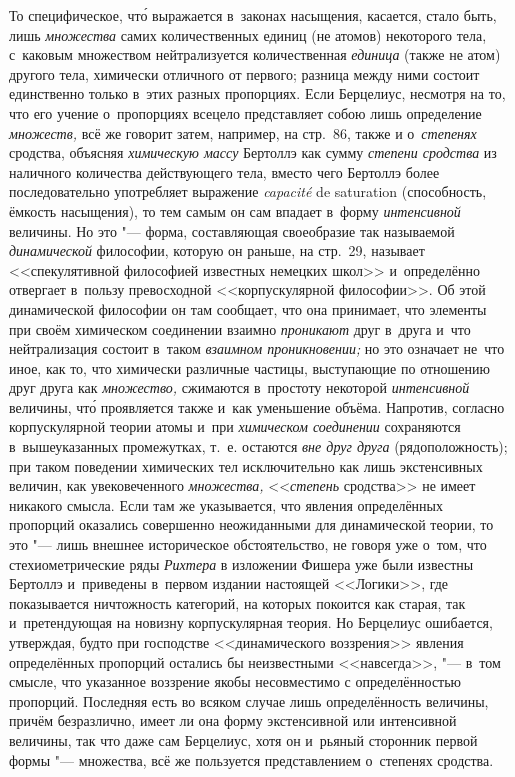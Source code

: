 То специфическое, чт\'{о} выражается в~законах насыщения, касается, стало быть,
лишь {\em множества} самих количественных единиц (не атомов) некоторого тела,
с~каковым множеством нейтрализуется количественная {\em единица} (также не
атом) другого тела, химически отличного от первого; разница между ними состоит
единственно только в~этих разных пропорциях. Если Берцелиус, несмотря на то,
что его учение о~пропорциях всецело представляет собою лишь определение
{\em множеств,} всё же говорит затем, например, на стр.~86, также и
о~{\em степенях} сродства, объясняя {\em химическую массу} Бертоллэ как сумму
{\em степени сродства} из наличного количества действующего тела, вместо чего
Бертоллэ более последовательно употребляет выражение {\em capa\-cité} de
satura\-tion (способность, ёмкость насыщения), то тем самым он сам впадает
в~форму {\em интенсивной} величины. Но это "--- форма, составляющая своеобразие
так называемой {\em динамической} философии, которую он раньше, на стр.~29,
называет <<спекулятивной философией известных немецких школ>> и~определённо
отвергает в~пользу превосходной <<корпускулярной философии>>. Об этой
динамической философии он там сообщает, что она принимает, что элементы при
своём химическом соединении взаимно {\em проникают} друг в~друга и~что
нейтрализация состоит в~таком {\em взаимном проникновении;} но это означает
не~что иное, как то, что химически различные частицы, выступающие по отношению
друг друга как {\em множество,} сжимаются в~простоту некоторой
{\em интенсивной} величины, чт\'{о} проявляется также и~как уменьшение объёма.
Напротив, согласно корпускулярной теории атомы и~при
{\em химическом соединении} сохраняются в~вышеуказанных промежутках, т.~е.
остаются {\em вне друг друга} (рядоположность); при таком поведении химических
тел исключительно как лишь экстенсивных величин, как увековеченного
{\em множества,} <<{\em степень} сродства>> не имеет никакого смысла. Если там
же указывается, что явления определённых пропорций оказались совершенно
неожиданными для динамической теории, то это "--- лишь внешнее историческое
обстоятельство, не говоря уже о~том, что стехиометрические ряды {\em Рихтера}
в изложении Фишера уже были известны Бертоллэ и~приведены в~первом издании
настоящей <<Логики>>, где показывается ничтожность категорий, на которых
покоится как старая, так и~претендующая на новизну корпускулярная теория.
Но Берцелиус ошибается, утверждая, будто при господстве <<динамического
воззрения>> явления определённых пропорций остались бы неизвестными
<<навсегда>>, "--- в~том смысле, что указанное воззрение якобы несовместимо с
определённостью пропорций. Последняя есть во всяком случае лишь определённость
величины, причём безразлично, имеет ли она форму экстенсивной или интенсивной
величины, так что даже сам Берцелиус, хотя он и~рьяный сторонник первой формы
"--- множества, всё же пользуется представлением о~степенях сродства.


